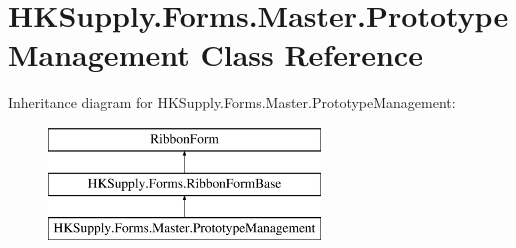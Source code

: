 \hypertarget{class_h_k_supply_1_1_forms_1_1_master_1_1_prototype_management}{}\section{H\+K\+Supply.\+Forms.\+Master.\+Prototype\+Management Class Reference}
\label{class_h_k_supply_1_1_forms_1_1_master_1_1_prototype_management}
Inheritance diagram for H\+K\+Supply.\+Forms.\+Master.\+Prototype\+Management\+:\begin{figure}[H]
\begin{center}
\leavevmode
\includegraphics[height=3.000000cm]{class_h_k_supply_1_1_forms_1_1_master_1_1_prototype_management}
\end{center}
\end{figure}
